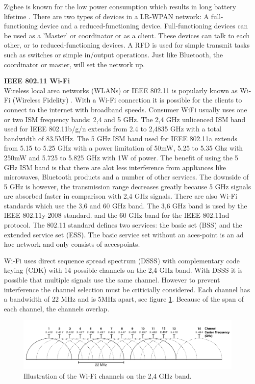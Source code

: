 \documentclass[10pt,a4paper]{article}
\begin{document}
Zigbee is known for the low power consumption which results in long battery lifetime \cite{performanceevaluationlowratewirelesspan}. There are two types of devices in a LR-WPAN network: A full-functioning device and a reduced-functioning device. Full-functioning devices can be used as a 'Master' or coordinator or as a client. These devices can talk to each other, or to reduced-functioning devices. A RFD is used for simple transmit tasks such as switches or simple in/output operations. Just like Bluetooth, the coordinator or master, will set the network up.

\textbf{\large IEEE 802.11 Wi-Fi}\\
Wireless local area networks (WLANs) or IEEE 802.11 is popularly known as Wi-Fi (Wireless Fidelity) \cite{wirelessmeshnetworksopportunitiesandchallenges}. With a Wi-Fi connection it is possible for the clients to connect to the internet with broadband speeds. Consumer WiFi usually uses one or two ISM frequency bands: 2,4 and 5 GHz. The 2,4 GHz unlicenced ISM band used for IEEE 802.11b/g/n extends from 2.4 to 2,4835 GHz with a total bandwidth of 83.5MHz. The 5 GHz ISM band used for IEEE 802.11a extends from 5.15 to 5.25 GHz with a power limitation of 50mW, 5.25 to 5.35 Ghz with 250mW and 5.725 to 5.825 GHz with 1W of power.\cite{combook} The benefit of using the 5 GHz ISM band is that there are alot less interference from appliances like microwaves, Bluetooth products and a number of other services. The downside of 5 GHz is however, the transmission range decreases greatly because 5 GHz signals are absorbed faster in comparison with 2,4 GHz signals. \cite{combook} There are also Wi-Fi standards which use the 3,6 and 60 GHz band. The 3,6 GHz band is used by the IEEE 802.11y-2008 standard. and the 60 GHz band for the IEEE 802.11ad protocol. The 802.11 standard defines two services: the basic set (BSS) and the extended service set (ESS). The basic service set without an aces-point is an ad hoc network and only consists of accespoints. 


Wi-Fi uses direct sequence spread spectrum (DSSS) with complementary code keying (CDK) with 14 possible channels on the 2,4 GHz band. With DSSS it is possible that multiple signals use the same channel. However to prevent interference the channel selection must be criticially considered. Each channel has a bandwidth of 22 MHz and is 5MHz apart, see figure \ref{fig:wifichannels}. \cite{combook} Because of the span of each channel, the channels overlap.

\begin{figure}[H]
   \centering
   \includegraphics[width=1\textwidth]{wifichannels}
   \caption{Illustration of the Wi-Fi channels on the 2,4 GHz band. \cite{wifichannels}}
   \label{fig:wifichannels}
\end{figure}
\end{document}
